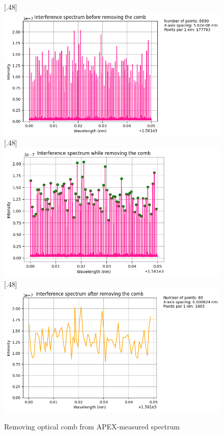 \documentclass{article}
\begin{document}
\begin{figure}[H]

\caption{Removing optical comb from APEX-measured spectrum}
[.48\linewidth]{%
\includegraphics[width=\linewidth]{comb_1}%
}
\hfill
{}[.48\linewidth]{%
\includegraphics[width=\linewidth]{comb_2}%
}
\vfill
{}[.48\linewidth]{%
\includegraphics[width=\linewidth]{comb_3}%
}
\end{figure}
\end{document}
